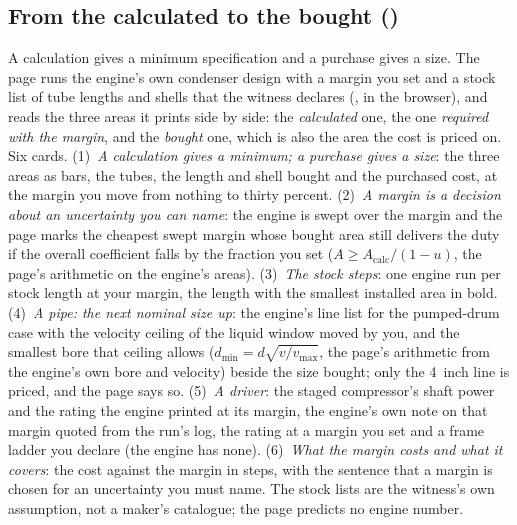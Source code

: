 \documentclass[11pt,a4paper]{article}
\begin{document}
\subsection*{From the calculated to the bought \quad()}\label{sec:edu-calculated-to-bought}
A calculation gives a minimum specification and a purchase gives a size.  The
page runs the engine's own condenser design with a margin you set and a stock
list of tube lengths and shells that the witness declares
(, in the browser), and reads the three
areas it prints side by side: the \emph{calculated} one, the one \emph{required
with the margin}, and the \emph{bought} one, which is also the area the cost is
priced on.  Six cards.  (1)~\emph{A calculation gives a minimum; a purchase
gives a size}: the three areas as bars, the tubes, the length and shell bought
and the purchased cost, at the margin you move from nothing to thirty percent.
(2)~\emph{A margin is a decision about an uncertainty you can name}: the engine
is swept over the margin and the page marks the cheapest swept margin whose
bought area still delivers the duty if the overall coefficient falls by the
fraction you set ($A\ge A_\mathrm{calc}/(1-u)$, the page's arithmetic on the
engine's areas).  (3)~\emph{The stock steps}: one engine run per stock length
at your margin, the length with the smallest installed area in bold.
(4)~\emph{A pipe: the next nominal size up}: the engine's line list for the
pumped-drum case with the velocity ceiling of the liquid window moved by you,
and the smallest bore that ceiling allows ($d_\mathrm{min}=d\sqrt{v/v_\mathrm{max}}$,
the page's arithmetic from the engine's own bore and velocity) beside the size
bought; only the 4~inch line is priced, and the page says so.
(5)~\emph{A driver}: the staged compressor's shaft power and the rating the
engine printed at its margin, the engine's own note on that margin quoted from
the run's log, the rating at a margin you set and a frame ladder you declare
(the engine has none).  (6)~\emph{What the margin costs and what it covers}: the
cost against the margin in steps, with the sentence that a margin is chosen for
an uncertainty you must name.  The stock lists are the witness's own
assumption, not a maker's catalogue; the page predicts no engine number.
\end{document}

